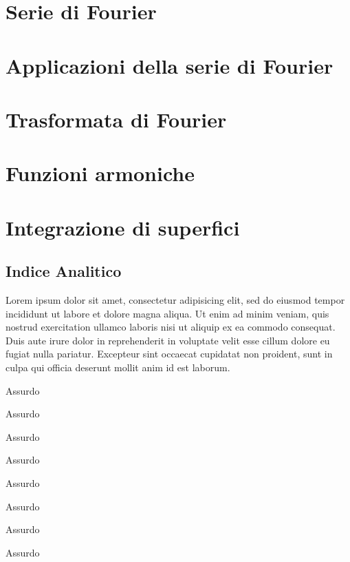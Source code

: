\documentclass[a4paper, 12pt]{report}
\begin{document}

\chapter{Serie di Fourier}


\chapter{Applicazioni della serie di Fourier}


\chapter{Trasformata di Fourier}


\chapter{Funzioni armoniche}


\chapter{Integrazione di superfici}


\newpage

\section{Indice Analitico}

Lorem ipsum dolor sit amet, consectetur adipisicing elit, sed do eiusmod
tempor incididunt ut labore et dolore magna aliqua. Ut enim ad minim veniam,
quis nostrud exercitation ullamco laboris nisi ut aliquip ex ea commodo
consequat. Duis aute irure dolor in reprehenderit in voluptate velit esse
cillum dolore eu fugiat nulla pariatur. Excepteur sint occaecat cupidatat non
proident, sunt in culpa qui officia deserunt mollit anim id est laborum.

\begin{multicols*}{2}

\makebox[3cm][l]{\absurd} Assurdo

\makebox[3cm][l]{\absurd} Assurdo

\makebox[3cm][l]{\absurd} Assurdo

\makebox[3cm][l]{\absurd} Assurdo

\vfill\null\columnbreak

\makebox[3cm][l]{\absurd} Assurdo

\makebox[3cm][l]{\absurd} Assurdo

\makebox[3cm][l]{\absurd} Assurdo

\makebox[3cm][l]{\absurd} Assurdo

\end{multicols*}
\end{document}
